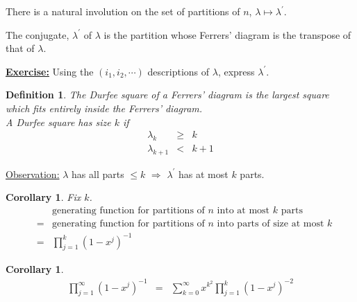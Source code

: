 \documentclass{article}
\newtheorem{corollary}[theorem]{Corollary}
\newtheorem{definition}[theorem]{Definition}
\def\bea{\begin{eqnarray*}}
\def\eea{\end{eqnarray*}}
\begin{document}
There is a natural involution on the set of partitions of $n$, $\lambda\mapsto\lambda^\prime$.

The conjugate, $\lambda^\prime$ of $\lambda$ is the partition whose Ferrers' diagram is the transpose of that of $\lambda$.

{\color{red} \textbf{\underline{Exercise:}} Using the $(i_1, i_2, \cdots)$ descriptions of $\lambda$, express $\lambda^\prime$.}

\begin{definition}
The Durfee square of a Ferrers' diagram is the largest square which fits entirely inside the Ferrers' diagram.\\
A Durfee square has size $k$ if
\bea
\lambda_k & \ge & k\\
\lambda_{k+1} & < & k+1
\eea
\end{definition}

\underline{Observation:} $\lambda$ has all parts $\le k$ $\Longrightarrow$ $\lambda^\prime$ has at most $k$ parts.

\begin{corollary}
Fix $k$.
\bea
&&\text{generating function for partitions of $n$ into at most $k$ parts}\\
& = &\text{generating function for partitions of $n$ into parts of size at most $k$}\\
& = & \prod\limits_{j=1}^k \left(1 - x^j\right)^{-1}
\eea
\end{corollary}

\begin{corollary}
\bea
\prod\limits_{j=1}^\infty \left(1 - x^j\right)^{-1} & = & \sum\limits_{k = 0} ^\infty x^{k^2} \prod\limits_{j=1}^k \left(1 - x^j\right)^{-2}
\eea
\end{corollary}
\begin{center}
\end{center}
\end{document}
